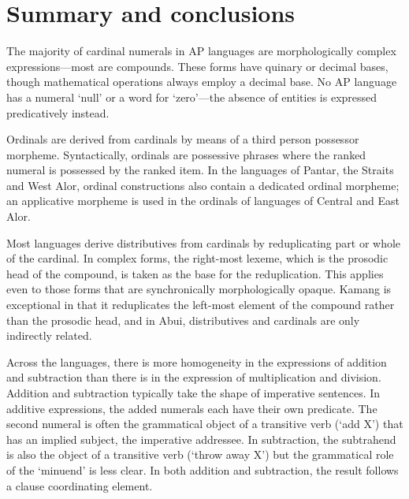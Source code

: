  

 

\section{Summary and conclusions}
\label{sec:8:Summary}
The majority of cardinal numerals in AP languages are morphologically complex expressions---most are compounds. These forms have quinary or decimal bases, though mathematical operations always employ a decimal base. No AP language has a numeral `null' or a word for `zero'---the absence of entities is expressed predicatively instead.

Ordinals are derived from cardinals by means of a third person possessor morpheme. Syntactically, ordinals are possessive phrases where the ranked numeral is possessed by the ranked item. In the languages of Pantar, the Straits and West Alor, ordinal constructions also contain a dedicated ordinal morpheme; an applicative morpheme is used in the ordinals of languages of Central and East Alor. 

Most languages derive distributives from cardinals by reduplicating part or whole of the cardinal. In complex forms, the right-most lexeme, which is the prosodic head of the compound, is taken as the base for the reduplication. This applies even to those forms that are synchronically morphologically opaque. Kamang is exceptional in that it reduplicates the left-most element of the compound rather than the prosodic head, and in Abui, distributives and cardinals are only indirectly related. 

Across the languages, there is more homogeneity in the expressions of addition and subtraction than there is in the expression of multiplication and division. Addition and subtraction typically take the shape of imperative sentences. In additive expressions, the added numerals each have their own predicate. The second numeral is often the grammatical object of a transitive verb (`add X') that has an implied subject, the imperative addressee. In subtraction, the subtrahend is also the object of a transitive verb (`throw away X') but the grammatical role of the `minuend' is less clear. In both addition and subtraction, the result follows a clause coordinating element.


